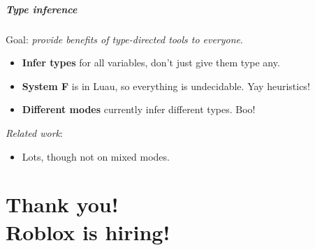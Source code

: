 \documentclass[aspectratio=169]{beamer}
\begin{document}
\begin{frame}

\frametitle{Type inference}

Goal: \emph{provide benefits of type-directed tools to everyone}.

\begin{itemize}
\item \textbf{Infer types} for all variables, don't just give them type any.
\item \textbf{System F} is in Luau, so everything is undecidable. Yay heuristics!
\item \textbf{Different modes} currently infer different types. Boo!
\end{itemize}

\emph{Related work}:
\begin{itemize}
\item Lots, though not on mixed modes.
\end{itemize}

\end{frame}

\part{Thank you!\\Roblox is hiring!}
\end{document}
